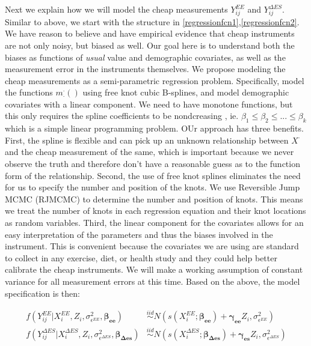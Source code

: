 \documentclass[11pt]{article}\usepackage[]{graphicx}\usepackage[]{color}
\begin{document}
Next we explain how we will model the cheap measurements $Y_{ij}^{EE}$ and $Y_{ij}^{\Delta ES}$. Similar to above, we start with the structure in \eqref{regressionfcn1},\eqref{regressionfcn2}. We have reason to believe and have empirical evidence that cheap instruments are not only noisy, but biased as well. Our goal here is to understand both the biases as functions of \emph{usual} value and demographic covariates, as well as the measurement error in the instruments themselves. We propose modeling the cheap measurements as a semi-parametric regression problem. Specifically, model the functions $m_{\cdot}^{\cdot}()$ using free knot cubic B-splines, and model demographic covariates with a linear component. We need to have monotone functions, but this only requires the spline coefficients to be nondcreasing \cite{sinha10}, ie. $\beta_1 \leq \beta_2 \leq ... \leq \beta_k$ which is a simple linear programming problem. OUr approach has three benefits. First, the spline is flexible and can pick up an unknown relationship between $X^{\cdot}$ and the cheap measurement of the same, which is important because we never observe the truth and therefore don't have a reasonable guess as to the function form of the relationship. Second, the use of free knot splines eliminates the need for us to specify the number and position of the knots. We use Reversible Jump MCMC (RJMCMC) to determine the number and position of knots. This means we treat the number of knots in each regression equation and their knot locations as random variables.  Third, the linear component for the covariates allows for an easy interpretation of the parameters and thus the biases involved in the instrument. This is convenient because the covariates we are using are standard to collect in any exercise, diet, or health study and they could help better calibrate the cheap instruments.  We will make a working assumption of constant variance for all measurement errors at this time. Based on the above, the model specification is then:

\begin{align}
  f(Y_{ij}^{EE}|X_i^{EE},Z_i,\sigma_{\epsilon^{EE}}^2,\boldsymbol{\beta_{ee}}) &\overset{iid}{\sim} N(s(X_i^{EE};\boldsymbol{\beta_{ee}}) + \boldsymbol{\gamma_{ee}}Z_i,\sigma_{\epsilon^{EE}}^2) \\
    f(Y_{ij}^{\Delta ES}|X_i^{\Delta ES},Z_i,\sigma_{\epsilon^{\Delta ES}}^2,\boldsymbol{\beta_{\Delta es}}) &\overset{iid}{\sim} N(s(X_i^{\Delta ES};\boldsymbol{\beta_{\Delta es}}) + \boldsymbol{\gamma_{es}}Z_i,\sigma_{\epsilon^{\Delta ES}}^2) \\
\end{align}
\end{document}

